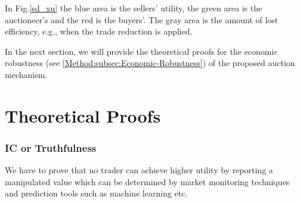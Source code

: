 \begin{enumerate}
In Fig.\ref{sd_xu} the blue area is the sellers' utility, the green area is the auctioneer's and the red is the buyers'. The gray area is the amount of lost efficiency, e.g., when the trade reduction is applied.
\end{enumerate}

In the next section, we will provide the theoretical proofs for the economic robustness (see \autoref{Method:subsec:Economic-Robustness}) of the proposed auction mechanism.




\section{Theoretical Proofs} \label{proofs}
\subsubsection{\acf{IC} or Truthfulness}
We have to prove that no trader can achieve higher utility by reporting a manipulated value which can be determined by market monitoring techniques and prediction tools such as machine learning etc.

